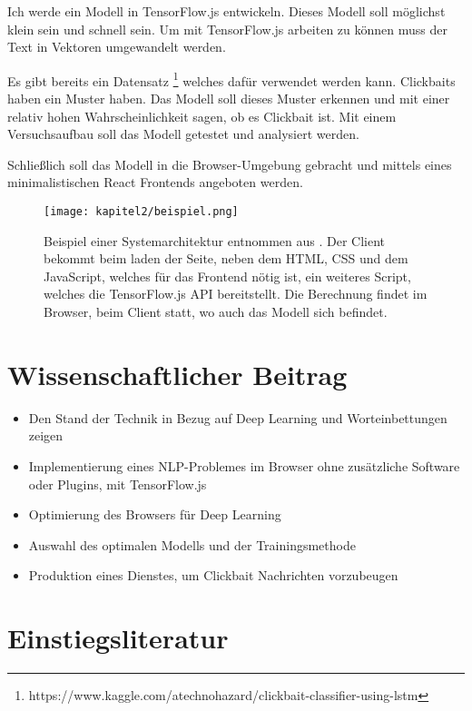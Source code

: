 Ich werde ein Modell in TensorFlow.js entwickeln. Dieses Modell soll möglichst klein sein und schnell sein. Um mit TensorFlow.js arbeiten zu können muss der Text in Vektoren umgewandelt werden.

Es gibt bereits ein Datensatz \footnote{https://www.kaggle.com/atechnohazard/clickbait-classifier-using-lstm} welches dafür verwendet werden kann. Clickbaits haben ein Muster haben. Das Modell soll dieses Muster erkennen und mit einer relativ hohen Wahrscheinlichkeit sagen, ob es Clickbait ist. Mit einem Versuchsaufbau soll das Modell getestet und analysiert werden. 

Schließlich soll das Modell in die Browser-Umgebung gebracht und mittels eines minimalistischen React Frontends angeboten werden.

\begin{figure}[ht]
  \centering
  \texttt{[image: kapitel2/beispiel.png]}
  \caption[Beispiel einer Systemarchitektur]{Beispiel einer Systemarchitektur entnommen aus \cite{cho2019shop}. Der Client bekommt beim laden der Seite, neben dem HTML, CSS und dem JavaScript, welches für das Frontend nötig ist, ein weiteres Script, welches die TensorFlow.js API bereitstellt. Die Berechnung findet im Browser, beim Client statt, wo auch das Modell sich befindet.}
  \label{Kap2:SystemArchitektur}
\end{figure}
 
\section{Wissenschaftlicher Beitrag}
\begin{itemize}
  \item Den Stand der Technik in Bezug auf Deep Learning und Worteinbettungen zeigen
  \item Implementierung eines NLP-Problemes im Browser ohne zusätzliche Software oder Plugins, mit TensorFlow.js
  \item Optimierung des Browsers für Deep Learning 
  \item Auswahl des optimalen Modells und der Trainingsmethode
  \item Produktion eines Dienstes, um Clickbait Nachrichten vorzubeugen
\end{itemize}

\section{Einstiegsliteratur}

